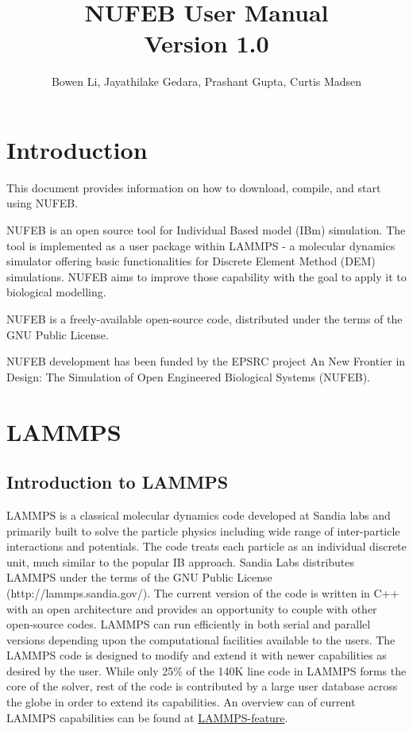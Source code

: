 \documentclass[11pt,a4paper,openright]{article}
\begin{document}
%
\title{NUFEB User Manual \\ Version 1.0}
\author{Bowen Li, Jayathilake Gedara, Prashant Gupta, Curtis Madsen}

\maketitle



\tableofcontents


\cleardoublepage
\setcounter{page}{1}


\section{Introduction}

This document provides information on how to download, compile, and start using NUFEB.

NUFEB is an open source tool for Individual Based model (IBm) simulation. The tool is implemented as a user package within LAMMPS - a molecular dynamics simulator offering basic functionalities for Discrete Element Method (DEM) simulations. NUFEB aims to improve those capability with the goal to apply it to biological modelling.  

NUFEB is a freely-available open-source code, distributed under the terms of the GNU Public License.

NUFEB development has been funded by the EPSRC project An New Frontier in Design: The Simulation of Open Engineered Biological Systems (NUFEB).

\section{LAMMPS}
\subsection{Introduction to LAMMPS}
LAMMPS is a classical molecular dynamics code developed at Sandia labs and primarily built to solve the particle physics including wide range of inter-particle interactions and potentials. The code treats each particle as an individual discrete unit, much similar to the popular IB approach. Sandia Labs distributes LAMMPS under the terms of the GNU Public License (http://lammps.sandia.gov/). The current version of the code is written in C++ with an open architecture and provides an opportunity to couple with other open-source codes. LAMMPS can run efficiently in both serial and parallel versions depending upon the computational facilities available to the users.  The LAMMPS code is designed to modify and extend it with newer capabilities as desired by the user. While only 25\% of the 140K line code in LAMMPS forms the core of the solver, rest of the code is contributed by a large user database across the globe in order to extend its capabilities. An overview can of current LAMMPS capabilities can be found at \href{http://lammps.sandia.gov/features.html}{LAMMPS-feature}.
\end{document}
